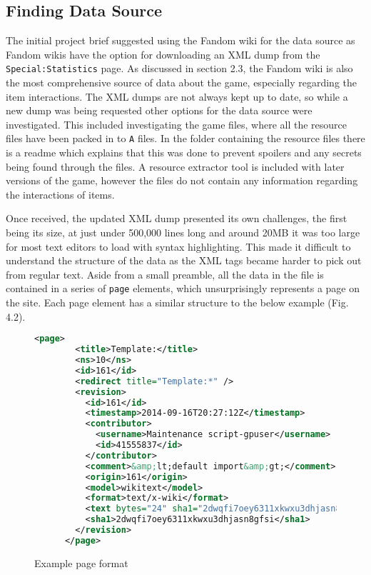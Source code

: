 \subsection{Finding Data Source}
The initial project brief suggested using the Fandom wiki for the data source as Fandom wikis have the option for downloading 
an XML dump from the \verb|Special:Statistics| page. As discussed in section 2.3, the Fandom wiki is also the most comprehensive 
source of data about the game, especially regarding the item interactions. The XML dumps are not always kept up to date, so while 
a new dump was being requested other options for the data source were investigated. This included investigating the game files, where 
all the resource files have been packed in to \verb|A| files. In the folder containing the resource files there is a readme which explains 
that this was done to prevent spoilers and any secrets being found through the files. A resource extractor tool is included with later versions of the game, 
however the files do not contain any information regarding the interactions of items.\par
Once received, the updated XML dump presented its own challenges, the first being its size, at just under 500,000 lines long and around 20MB it was too 
large for most text editors to load with syntax highlighting. This made it difficult to understand the structure of the data as the XML tags became harder 
to pick out from regular text. Aside from a small preamble, all the data in the file is contained in a series of \verb|page| elements, which unsurprisingly represents a page on the site.
Each page element has a similar structure to the below example (Fig. 4.2).
\begin{figure}[H]
    \begin{lstlisting}[language=XML]
        <page>
        <title>Template:</title>
        <ns>10</ns>
        <id>161</id>
        <redirect title="Template:*" />
        <revision>
          <id>161</id>
          <timestamp>2014-09-16T20:27:12Z</timestamp>
          <contributor>
            <username>Maintenance script-gpuser</username>
            <id>41555837</id>
          </contributor>
          <comment>&amp;lt;default import&amp;gt;</comment>
          <origin>161</origin>
          <model>wikitext</model>
          <format>text/x-wiki</format>
          <text bytes="24" sha1="2dwqfi7oey6311xkwxu3dhjasn8gfsi" xml:space="preserve">#redirect [[Template:*]]</text>
          <sha1>2dwqfi7oey6311xkwxu3dhjasn8gfsi</sha1>
        </revision>
      </page>
    \end{lstlisting}
    \caption{Example page format}
\end{figure}

